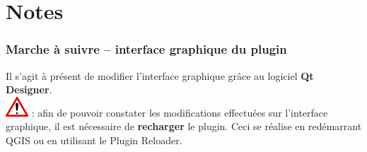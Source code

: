 \documentclass[11pt]{article}
\begin{document}
\section*{Notes}
\hrulefill
\vspace*{1.6em}

\hrulefill
\vspace*{1.6em}

\hrulefill
\vspace*{1.6em}

\hrulefill
\vspace*{1.6em}

\hrulefill
\vspace*{1.6em}

\hrulefill
\vspace*{1.6em}

\hrulefill
\vspace*{1.6em}

\hrulefill
\vspace*{1.6em}

\hrulefill
\vspace*{1.6em}

\hrulefill
\vspace*{1.6em}

\hrulefill
\vspace*{1.6em}

\hrulefill
\vspace*{1.6em}

\hrulefill
\vspace*{1.6em}
















\newpage{}
\vspace*{-3.2em}
\subsubsection{Marche à suivre \--- interface graphique du plugin}
Il s'agit à présent de modifier l'interface graphique grâce au logiciel \og{}\textbf{Qt Designer}\fg{}. \\

\vspace*{-0.4em}
\includegraphics[scale=1]{warningt.png} \underline{}: afin de pouvoir constater les modifications effectuées sur l'interface graphique, il est nécessaire de \textbf{recharger} le plugin. Ceci se réalise en redémarrant QGIS ou en utilisant le \og{}Plugin Reloader\fg{}. 
\end{document}
